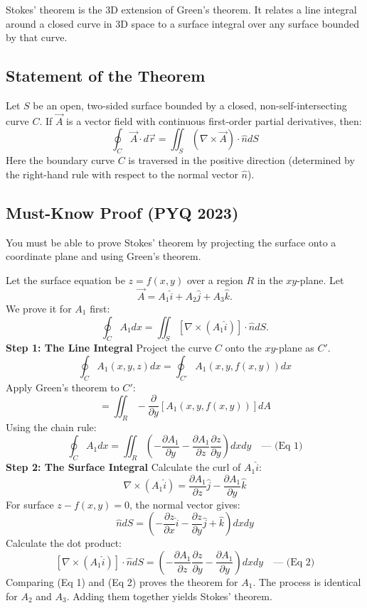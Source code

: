 \documentclass[
]{article}
\begin{document}
Stokes' theorem is the 3D extension of Green's theorem. It relates a
line integral around a closed curve in 3D space to a surface integral
over any surface bounded by that curve.

\subsection{Statement of the Theorem}\label{statement-of-the-theorem-1}

Let \(S\) be an open, two-sided surface bounded by a closed,
non-self-intersecting curve \(C\). If \(\vec{A}\) is a vector field with
continuous first-order partial derivatives, then:
\[
\oint_C \vec{A} \cdot d\vec{r} = \iint_S (\nabla \times \vec{A}) \cdot \hat{n} dS
\]
Here the boundary curve \(C\) is traversed in the positive direction
(determined by the right-hand rule with respect to the normal vector
\(\hat{n}\)).

\subsection{Must-Know Proof (PYQ 2023)}\label{must-know-proof-pyq-2023}

You must be able to prove Stokes' theorem by projecting the surface onto
a coordinate plane and using Green's theorem.

Let the surface equation be \(z = f(x, y)\) over a region \(R\) in the
\(xy\)-plane. Let
\[
\vec{A} = A_1\hat{i} + A_2\hat{j} + A_3\hat{k}.
\]
We prove it for \(A_1\) first:
\[
\oint_C A_1 dx = \iint_S [\nabla \times (A_1\hat{i})] \cdot \hat{n} dS.
\]
\textbf{Step 1: The Line Integral} Project the curve \(C\) onto the
\(xy\)-plane as \(C'\).
\[
\oint_C A_1(x, y, z) dx = \oint_{C'} A_1(x, y, f(x, y)) dx
\]
Apply Green's theorem to \(C'\):
\[
= \iint_R -\frac{\partial}{\partial y} [A_1(x, y, f(x, y))] dA
\]
Using the chain rule:
\[
\oint_C A_1 dx = \iint_R \left( -\frac{\partial A_1}{\partial y} - \frac{\partial A_1}{\partial z}\frac{\partial z}{\partial y} \right) dx dy \quad \text{--- (Eq 1)}
\]
\textbf{Step 2: The Surface Integral} Calculate the curl of
\(A_1\hat{i}\):
\[
\nabla \times (A_1\hat{i}) = \frac{\partial A_1}{\partial z}\hat{j} - \frac{\partial A_1}{\partial y}\hat{k}
\]
For surface \(z - f(x, y) = 0\), the normal vector gives:
\[
\hat{n} dS = \left( -\frac{\partial z}{\partial x}\hat{i} - \frac{\partial z}{\partial y}\hat{j} + \hat{k} \right) dx dy
\]
Calculate the dot product:
\[
[\nabla \times (A_1\hat{i})] \cdot \hat{n} dS = \left( -\frac{\partial A_1}{\partial z}\frac{\partial z}{\partial y} - \frac{\partial A_1}{\partial y} \right) dx dy \quad \text{--- (Eq 2)}
\]
Comparing (Eq 1) and (Eq 2) proves the theorem for \(A_1\). The process
is identical for \(A_2\) and \(A_3\). Adding them together yields
Stokes' theorem.
\end{document}
